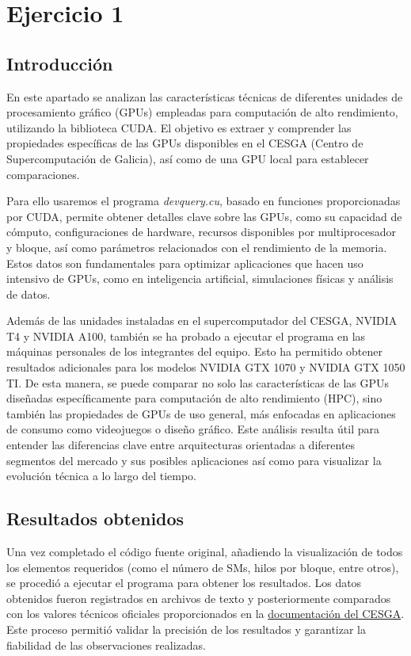 \documentclass{article}
\begin{document}
\section{Ejercicio 1}

	\subsection{Introducción}

		En este apartado se analizan las características técnicas de diferentes unidades de procesamiento gráfico (GPUs) empleadas para computación de alto rendimiento, utilizando la biblioteca CUDA. El objetivo es extraer y comprender las propiedades específicas de las GPUs disponibles en el CESGA (Centro de Supercomputación de Galicia), así como de una GPU local para establecer comparaciones.

		Para ello usaremos el programa \textit{devquery.cu}, basado en funciones proporcionadas por CUDA, permite obtener detalles clave sobre las GPUs, como su capacidad de cómputo, configuraciones de hardware, recursos disponibles por multiprocesador y bloque, así como parámetros relacionados con el rendimiento de la memoria. Estos datos son fundamentales para optimizar aplicaciones que hacen uso intensivo de GPUs, como en inteligencia artificial, simulaciones físicas y análisis de datos.

		Además de las unidades instaladas en el supercomputador del CESGA, NVIDIA T4 y NVIDIA A100, también se ha probado a ejecutar el programa en las máquinas personales de los integrantes del equipo. Esto ha permitido obtener resultados adicionales para los modelos NVIDIA GTX 1070 y NVIDIA GTX 1050 TI. De esta manera, se puede comparar no solo las características de las GPUs diseñadas específicamente para computación de alto rendimiento (HPC), sino también las propiedades de GPUs de uso general, más enfocadas en aplicaciones de consumo como videojuegos o diseño gráfico. Este análisis resulta útil para entender las diferencias clave entre arquitecturas orientadas a diferentes segmentos del mercado y sus posibles aplicaciones así como para visualizar la evolución técnica a lo largo del tiempo.

	\subsection{Resultados obtenidos}

		Una vez completado el código fuente original, añadiendo la visualización de todos los elementos requeridos (como el número de SMs, hilos por bloque, entre otros), se procedió a ejecutar el programa para obtener los resultados. Los datos obtenidos fueron registrados en archivos de texto y posteriormente comparados con los valores técnicos oficiales proporcionados en la \href{https://cesga-docs.gitlab.io/ft3-user-guide/gpu_nodes.html}{documentación del CESGA}. Este proceso permitió validar la precisión de los resultados y garantizar la fiabilidad de las observaciones realizadas.
\end{document}
